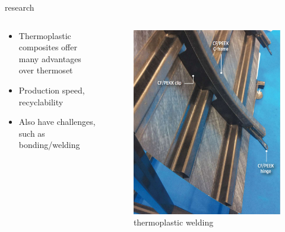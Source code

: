 \documentclass[
  letterpaper,
  ignorenonframetext,
  aspectratio=43,
  handout,
  12pt]{beamer}
\providecommand{\tightlist}{%
  \setlength{\itemsep}{0pt}\setlength{\parskip}{0pt}}
\providecommand{\tightlist}{%
\setlength{\itemsep}{0pt}\setlength{\parskip}{0pt}}
\let\Oldincludegraphics\includegraphics
\renewcommand{\includegraphics}[2][]{\Oldincludegraphics[width=\textwidth,height=0.7\textheight,keepaspectratio]{#2}}
\begin{document}
\begin{frame}{research}
\protect\hypertarget{research-3}{}
\begin{columns}[T]
\begin{column}{0.5\textwidth}
\begin{itemize}
\tightlist
\item
  Thermoplastic composites offer many advantages over thermoset
\item
  Production speed, recyclability
\item
  Also have challenges, such as bonding/welding
\end{itemize}
\end{column}

\begin{column}{0.5\textwidth}
\begin{figure}
\centering
\includegraphics{../images/Welding-thermoplastic-composites.jpg}
\caption{thermoplastic welding}
\end{figure}
\end{column}
\end{columns}
\end{frame}
\end{document}
